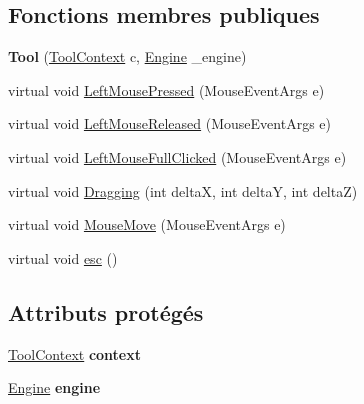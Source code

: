 \subsection*{Fonctions membres publiques}
\begin{DoxyCompactItemize}
\item 
\hypertarget{class_interface_graphique_1_1_tools_1_1_tool_a27fe52c653e68059ac0c9b4a659a1dc5}{{\bfseries Tool} (\hyperlink{class_interface_graphique_1_1_tools_1_1_tool_context}{Tool\-Context} c, \hyperlink{class_interface_graphique_1_1_engine}{Engine} \-\_\-engine)}\label{class_interface_graphique_1_1_tools_1_1_tool_a27fe52c653e68059ac0c9b4a659a1dc5}

\item 
virtual void \hyperlink{class_interface_graphique_1_1_tools_1_1_tool_af5c8a4b2773f0d09f45575ade24769ba}{Left\-Mouse\-Pressed} (Mouse\-Event\-Args e)
\item 
virtual void \hyperlink{class_interface_graphique_1_1_tools_1_1_tool_a51c4828f7d24c599b5748b9b3f64d39e}{Left\-Mouse\-Released} (Mouse\-Event\-Args e)
\item 
virtual void \hyperlink{class_interface_graphique_1_1_tools_1_1_tool_a043f210d7840ec8aa5723b193e71ead5}{Left\-Mouse\-Full\-Clicked} (Mouse\-Event\-Args e)
\item 
virtual void \hyperlink{class_interface_graphique_1_1_tools_1_1_tool_a8b9595e6a3eb55443b8b2cdb38a2c390}{Dragging} (int delta\-X, int delta\-Y, int delta\-Z)
\item 
virtual void \hyperlink{class_interface_graphique_1_1_tools_1_1_tool_aedd1c93f96ee602475b7cbc3c9c99baa}{Mouse\-Move} (Mouse\-Event\-Args e)
\item 
virtual void \hyperlink{class_interface_graphique_1_1_tools_1_1_tool_a734cc3904ce75149652ac356caba93f7}{esc} ()
\end{DoxyCompactItemize}
\subsection*{Attributs protégés}
\begin{DoxyCompactItemize}
\item 
\hypertarget{class_interface_graphique_1_1_tools_1_1_tool_a2e90caf64fbe40155b406a3ff5ef40f0}{\hyperlink{class_interface_graphique_1_1_tools_1_1_tool_context}{Tool\-Context} {\bfseries context}}\label{class_interface_graphique_1_1_tools_1_1_tool_a2e90caf64fbe40155b406a3ff5ef40f0}

\item 
\hypertarget{class_interface_graphique_1_1_tools_1_1_tool_af0a87b3fed2a89f191039222735a2e00}{\hyperlink{class_interface_graphique_1_1_engine}{Engine} {\bfseries engine}}\label{class_interface_graphique_1_1_tools_1_1_tool_af0a87b3fed2a89f191039222735a2e00}

\end{DoxyCompactItemize}


